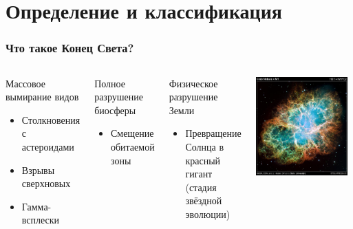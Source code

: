 \documentclass[aspectratio=169]{beamer}
\begin{document}
\section{Определение и классификация}

\begin{frame}
\frametitle{Что такое Конец Света?}
\begin{columns}[c]
\begin{block}{Массовое вымирание видов}
      \begin{itemize}
        \item Столкновения с астероидами
        \item Взрывы сверхновых
        \item Гамма-всплески
      \end{itemize}
\end{block}
\begin{block}{Полное разрушение биосферы}
      \begin{itemize}
      \item Смещение обитаемой зоны
      \end{itemize}
\end{block}
\begin{block}{Физическое разрушение Земли}
      \begin{itemize}
      \item Превращение Солнца в красный гигант (стадия звёздной эволюции)
      \end{itemize}
\end{block}
\includegraphics[width=0.95\textwidth]{img/crab_nebula_web_print.jpg}
\end{columns}
\end{frame}
\end{document}
